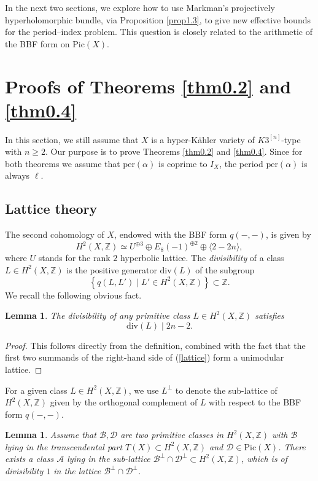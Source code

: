 \documentclass[11pt]{amsart}
\theoremstyle{plain}
\newtheorem{lem}[thm]{Lemma}
\theoremstyle{definition}
\theoremstyle{remark}
\newcommand{\BZ}{{\mathbb{Z}}}
\newcommand{\CA}{{\mathcal A}}
\newcommand{\CB}{{\mathcal B}}
\newcommand{\CD}{{\mathcal D}}
\begin{document}
In the next two sections, we explore how to use Markman's projectively hyperholomorphic bundle, via Proposition \ref{prop1.3}, to give new effective bounds for the period--index problem. This question is closely related to the arithmetic of the BBF form on $\mathrm{Pic}(X)$.





\section{Proofs of Theorems \ref{thm0.2} and \ref{thm0.4}}

In this section, we still assume that $X$ is a hyper-K\"ahler variety of $K3^{[n]}$-type with $n \geq 2$. Our purpose is to prove Theorems \ref{thm0.2} and \ref{thm0.4}. Since for both theorems we assume that $\mathrm{per}(\alpha)$ is coprime to $I_X$, the period $\mathrm{per}(\alpha)$ is always $\ell$.

\subsection{Lattice theory}
The second cohomology of $X$, endowed with the BBF form $q(-, -)$, is given by
\begin{equation}\label{lattice}
H^2(X, \BZ) \simeq U^{\oplus 3} \oplus E_8(-1)^{\oplus 2} \oplus \langle 2-2n \rangle,
\end{equation}
where $U$ stands for the rank $2$ hyperbolic lattice. The \emph{divisibility} of a class $L\in H^2(X,\BZ)$ is the positive generator $\mathrm{div}(L)$ of the subgroup
\[
\left\{ q(L, L') \mid L'\in H^2(X, \BZ)  \right\} \subset \BZ.
\]
We recall the following obvious fact.
\begin{lem}\label{lem2.1}
    The divisibility of any primitive class $L \in H^2(X, \BZ)$ satisfies 
\[
\mathrm{div}(L) \mid 2n-2.
\]
\end{lem}
\begin{proof}
This follows directly from the definition, combined with the fact that the first two summands of the right-hand side of (\ref{lattice}) form a unimodular lattice.
\end{proof}

For a given class $L\in H^2(X,\BZ)$, we use $L^\perp$ to denote the sub-lattice of $H^2(X,\BZ)$ given by the orthogonal complement of $L$ with respect to the BBF form $q(-, -)$.

\begin{lem}\label{lem2.2}
Assume that $\CB,\CD$ are two primitive classes in $H^2(X, \BZ)$ with $\CB$ lying in the transcendental part $T(X) \subset H^2(X, \BZ)$ and $\CD \in \mathrm{Pic}(X)$. There exists a class $\CA$ lying in the sub-lattice $\CB^\perp \cap \CD^\perp \subset H^2(X, \BZ)$, which is of divisibility $1$ in the lattice $\CB^\perp \cap \CD^\perp$. 
\end{lem} 
 
\end{document}
